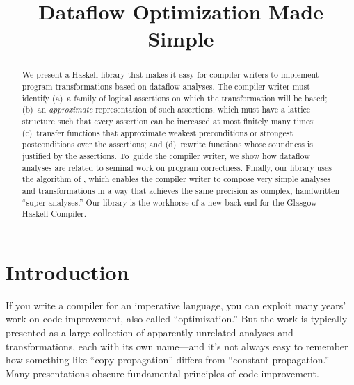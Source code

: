 \documentclass[blockstyle,preprint,nocopyrightspace]{sigplanconf}
\begin{document}
\title{Dataflow Optimization Made Simple}



\maketitle
 
\begin{abstract}
We present a Haskell library that makes it easy for compiler writers
to implement program transformations based on dataflow analyses.
The compiler writer must identify (a)~a family of logical assertions
on which the transformation will be based;
(b)~an \emph{approximate} representation of such assertions, which
must have a lattice structure such that every assertion can be increased at
most finitely many times;
(c)~transfer functions that approximate weakest preconditions or
strongest postconditions over the assertions; and
(d)~rewrite functions whose soundness is justified by the assertions.
To~guide the compiler writer,
we show how dataflow analyses are related to
seminal work on program 
correctness. 
Finally, our library uses the algorithm of 
\citet{lerner-grove-chambers:2002}, which enables the compiler writer to
compose very simple analyses and transformations in a way that achieves
the same precision as complex, handwritten
``super-analyses.''
Our library is the workhorse of a new
back end for the Glasgow Haskell Compiler.
\end{abstract}

\makeatactive   %

\section{Introduction}

\ifpagetuning\enlargethispage{\baselineskip}\fi

If you write a compiler for an imperative language, you can exploit
many years' work on code improvement, also called
``optimization.''
But the work is typically presented
as a large collection of apparently unrelated analyses and
transformations, each with its own name---and 
it's not always easy to %
remember how something like
``copy propagation'' differs from ``constant propagation.''
Many presentations obscure fundamental principles of
code improvement.
\end{document}
